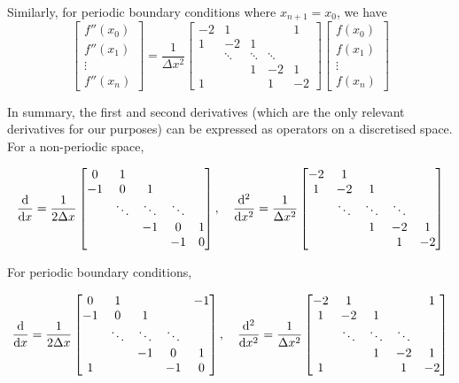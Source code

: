 \documentclass[11pt]{article}
\begin{document}
Similarly, for periodic boundary conditions where $x_{n+1} = x_0$, we have 
\begin{equation}
\begin{bmatrix}
	f''(x_0) \\ f''(x_1) \\ \vdots \\ f''(x_n)
\end{bmatrix}
=
\frac{1}{\Delta x^2}
\begin{bmatrix}
	-2 & 1 & & & 1 \\
	1 & -2 & 1 \\
	& \ddots & \ddots & \ddots \\
	& & 1 & -2 & 1 \\
	1 & & & 1 & -2
\end{bmatrix}
\begin{bmatrix}
	f(x_0) \\ f(x_1) \\ \vdots \\ f(x_n)
\end{bmatrix}
\end{equation}


In summary, the first and second derivatives (which are the only relevant derivatives for our purposes) can be expressed as operators on a discretised space. For a non-periodic space,

\begin{equation}
\dv{x} =
\frac{1}{2 \Delta x}
\begin{bmatrix}
	0 & 1 \\
	-1 & 0 & 1 \\
	& \ddots & \ddots & \ddots \\
	& & -1 & 0 & 1 \\
	& & & -1 & 0
\end{bmatrix},
\quad
\dv[2]{x} =
\frac{1}{\Delta x^2}
\begin{bmatrix}
	-2 & 1 \\
	1 & -2 & 1 \\
	& \ddots & \ddots & \ddots \\
	& & 1 & -2 & 1 \\
	& & & 1 & -2
\end{bmatrix}
\end{equation} 

For periodic boundary conditions,

\begin{equation}
\dv{x} =
\frac{1}{2 \Delta x}
\begin{bmatrix}
	0 & 1 & & & -1 \\
	-1 & 0 & 1 \\
	& \ddots & \ddots & \ddots \\
	& & -1 & 0 & 1 \\
	1 & & & -1 & 0
\end{bmatrix},
\quad
\dv[2]{x} =
\frac{1}{\Delta x^2}
\begin{bmatrix}
	-2 & 1 & & & 1 \\
	1 & -2 & 1 \\
	& \ddots & \ddots & \ddots \\
	& & 1 & -2 & 1 \\
	1 & & & 1 & -2
\end{bmatrix}
\end{equation} 
\end{document}
